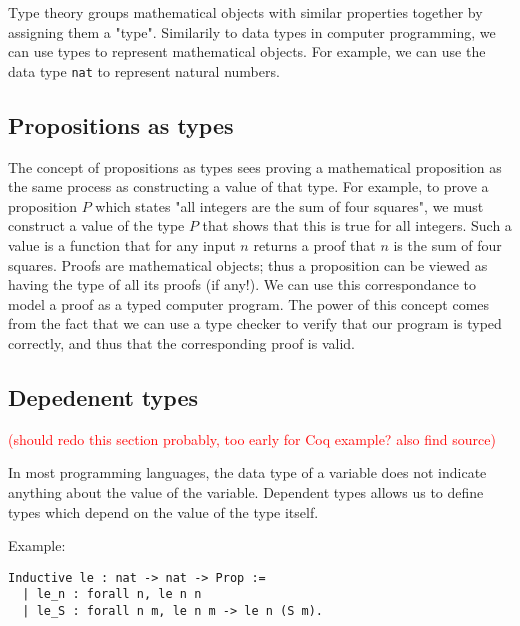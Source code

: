 Type theory groups mathematical objects with similar properties together by assigning them a "type".
Similarily to data types in computer programming, we can use types to represent mathematical
objects. For example, we can use the data type \texttt{nat} to represent natural numbers.

\subsection{Propositions as types}


The concept of propositions as types sees proving a mathematical proposition
as the same process as constructing a value of that type.
For example, to prove a proposition $P$ which states "all integers are the sum of four squares",
we must construct a value of the type $P$ that shows that this is true for all integers.
Such a value is a function that for any input $n$ returns a proof that $n$ is the sum of four squares.
Proofs are mathematical objects; thus a proposition can be viewed as having the type of all its proofs (if any!).
We can use this correspondance to model a proof as a typed computer program.
The power of this concept comes from the fact that we can use a type checker to verify that
our program is typed correctly, and thus that the corresponding proof is valid.

\subsection{Depedenent types}

\textcolor{red}{(should redo this section probably, too early for Coq example? also find source)}

In most programming languages, the data type of a variable does not indicate anything about the value of the variable.
Dependent types allows us to define types which depend on the value of the type itself.

Example:

\begin{minipage}{\linewidth}
\begin{lstlisting}[language=Coq, label={lst:dep_type_le}, caption={Def. of \lstinline{le} in Coq, using dependent types}]
Inductive le : nat -> nat -> Prop :=
  | le_n : forall n, le n n
  | le_S : forall n m, le n m -> le n (S m).
\end{lstlisting}
\end{minipage}

